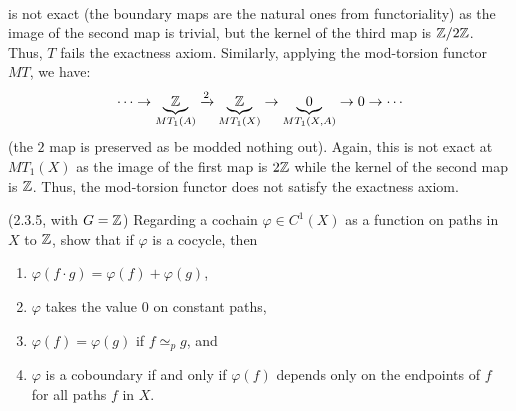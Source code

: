 \documentclass[12pt]{article}
\begin{document}
\begin{solution}
\begin{align*}
    \end{align*}
    is not exact (the boundary maps are the natural ones from functoriality) as the image of the second map is trivial, but the kernel of the third map is $\mathbb Z/2\mathbb Z$. Thus, $T$ fails the exactness axiom. \bbni 
    Similarly, applying the mod-torsion functor $MT$, we have: 
    \begin{align*}
        \cdots \to \underbrace{\mathbb Z}_{MT_1(A)} \xrightarrow{2} \underbrace{\mathbb Z}_{MT_1(X)} \to \underbrace{0}_{MT_1(X,A)} \to 0 \to \cdots
    \end{align*}
    (the $2$ map is preserved as be modded nothing out). Again, this is not exact at $MT_1(X)$ as the image of the first map is $2\mathbb Z$ while the kernel of the second map is $\mathbb Z$. Thus, the mod-torsion functor does not satisfy the exactness axiom. \bbni
\end{solution}
\newpage

\begin{problem}{2}(2.3.5, with $G= \mathbb Z$) 
    Regarding a cochain $\varphi \in C^1(X)$ as a function on paths in $X$ to $\mathbb Z$, show that if $\varphi$ is a cocycle, then 
    \begin{enumerate}
    \item $\varphi(f \cdot g) = \varphi(f) + \varphi(g)$,
    \item $\varphi$ takes the value $0$ on constant paths,
    \item $\varphi(f) = \varphi(g)$ if $f \simeq_p g$, and
    \item $\varphi$ is a coboundary if and only if $\varphi(f)$ depends only on the endpoints of $f$ for all paths $f$ in $X$.
    \end{enumerate}
\end{problem}
\end{document}
